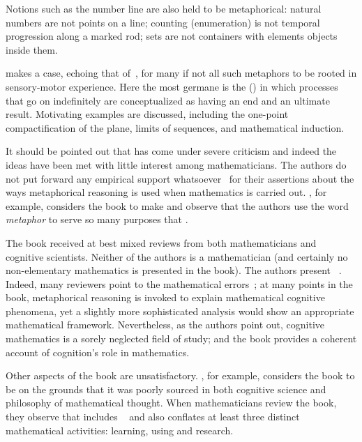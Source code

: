 Notions such as the number line are also held to be metaphorical:
natural numbers are not points on a line; counting (enumeration) is
not temporal progression along a marked rod; sets are not containers
with elements objects inside them.

\wmcf makes a case, echoing that of~, for many if not
all such metaphors to be rooted in sensory-motor experience.  Here the
most germane is the  (\bmi) in
which processes that go on indefinitely are conceptualized as having
an end and an ultimate result.  Motivating examples are discussed,
including the one-point compactification of the plane, limits of
sequences, and mathematical induction.

It should be pointed out that \wmcf has come under severe criticism
and indeed the ideas have been met with little interest among
mathematicians.  The authors do not put forward any empirical support
whatsoever~\parencite{madden2001} for their assertions about the ways
metaphorical reasoning is used when mathematics is carried out.
, for example, considers the book to make
 and observe that the authors
use the word \emph{metaphor} to serve so many purposes that
.

The book received at best mixed reviews from both mathematicians and
cognitive scientists.  Neither of the authors is a mathematician (and
certainly no non-elementary mathematics is presented in the book).
The authors present ~\parencite{henderson2002}.
Indeed, many reviewers point to the 
mathematical errors~\parencite{gold2001}; at many points in the book,
metaphorical reasoning is invoked to explain mathematical cognitive
phenomena, yet a slightly more sophisticated analysis would show an
appropriate mathematical framework.  Nevertheless, as the authors
point out, cognitive mathematics is a sorely neglected field of study;
and the book provides a coherent account of cognition's role in
mathematics.

Other aspects of the book are unsatisfactory.  , for
example, considers the book to be  on the
grounds that it was poorly sourced in both cognitive science and
philosophy of mathematical thought.  When mathematicians review the
book, they observe that \wmcf includes ~\parencite{henderson2002} and also conflates at
least three distinct mathematical activities: learning, using and
research.

